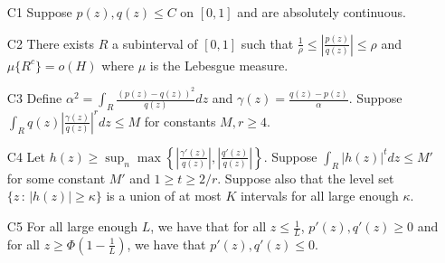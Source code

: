 \begin{proposition}
\begin{enumerate}
\item[C1] Suppose $p(z), q(z) \leq C$ on $[0,1]$ and are absolutely continuous.
\item[C2] There exists $R$ a subinterval of $[0,1]$ such that $\frac{1}{\rho} \leq \left| \frac{p(z)}{q(z)} \right| \leq \rho$ and $\mu\{R^c\} = o(H)$ where $\mu$ is the Lebesgue measure.
\item[C3] Define $\alpha^2 = \int_R \frac{(p(z) - q(z))^2}{q(z)} dz$ and $\gamma(z) = \frac{q(z) - p(z)}{\alpha}$. Suppose $\int_R q(z) \left| \frac{\gamma(z)}{q(z)} \right|^r dz  \leq M$ for constants $M, r \geq 4$.
\item[C4] Let $h(z) \geq \sup_n \max \left\{  \left|\frac{\gamma'(z)}{q(z)} \right|, 
 \left|\frac{q'(z)}{q(z)}\right|  \right\} $. Suppose $\int_R |h(z)|^t dz \leq M'$ for some constant $M'$ and $1 \geq t \geq 2/r$. Suppose also that the level set $\{z \,:\, |h(z)| \geq \kappa\}$ is a union of at most $K$ intervals for all large enough $\kappa$.  
\item[C5] For all large enough $L$, we have that for all $z \leq \frac{1}{L}$, $p'(z), q'(z) \geq 0$ and for all $z \geq \Phi(1 - \frac{1}{L})$, we have that $p'(z), q'(z) \leq 0$.
\end{enumerate}

\end{proposition}


